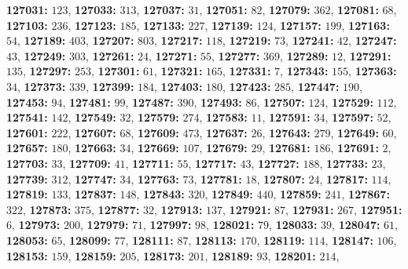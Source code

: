 \textsf{\bfseries 127031:} $123$, \textsf{\bfseries 127033:} $313$, \textsf{\bfseries 127037:} $31$, \textsf{\bfseries 127051:} $82$, \textsf{\bfseries 127079:} $362$, \textsf{\bfseries 127081:} $68$, \textsf{\bfseries 127103:} $236$, \textsf{\bfseries 127123:} $185$, \textsf{\bfseries 127133:} $227$, \textsf{\bfseries 127139:} $124$, \textsf{\bfseries 127157:} $199$, \textsf{\bfseries 127163:} $54$, \textsf{\bfseries 127189:} $403$, \textsf{\bfseries 127207:} $803$, \textsf{\bfseries 127217:} $118$, \textsf{\bfseries 127219:} $73$, \textsf{\bfseries 127241:} $42$, \textsf{\bfseries 127247:} $43$, \textsf{\bfseries 127249:} $303$, \textsf{\bfseries 127261:} $24$, \textsf{\bfseries 127271:} $55$, \textsf{\bfseries 127277:} $369$, \textsf{\bfseries 127289:} $12$, \textsf{\bfseries 127291:} $135$, \textsf{\bfseries 127297:} $253$, \textsf{\bfseries 127301:} $61$, \textsf{\bfseries 127321:} $165$, \textsf{\bfseries 127331:} $7$, \textsf{\bfseries 127343:} $155$, \textsf{\bfseries 127363:} $34$, \textsf{\bfseries 127373:} $339$, \textsf{\bfseries 127399:} $184$, \textsf{\bfseries 127403:} $180$, \textsf{\bfseries 127423:} $285$, \textsf{\bfseries 127447:} $190$, \textsf{\bfseries 127453:} $94$, \textsf{\bfseries 127481:} $99$, \textsf{\bfseries 127487:} $390$, \textsf{\bfseries 127493:} $86$, \textsf{\bfseries 127507:} $124$, \textsf{\bfseries 127529:} $112$, \textsf{\bfseries 127541:} $142$, \textsf{\bfseries 127549:} $32$, \textsf{\bfseries 127579:} $274$, \textsf{\bfseries 127583:} $11$, \textsf{\bfseries 127591:} $34$, \textsf{\bfseries 127597:} $52$, \textsf{\bfseries 127601:} $222$, \textsf{\bfseries 127607:} $68$, \textsf{\bfseries 127609:} $473$, \textsf{\bfseries 127637:} $26$, \textsf{\bfseries 127643:} $279$, \textsf{\bfseries 127649:} $60$, \textsf{\bfseries 127657:} $180$, \textsf{\bfseries 127663:} $34$, \textsf{\bfseries 127669:} $107$, \textsf{\bfseries 127679:} $29$, \textsf{\bfseries 127681:} $186$, \textsf{\bfseries 127691:} $2$, \textsf{\bfseries 127703:} $33$, \textsf{\bfseries 127709:} $41$, \textsf{\bfseries 127711:} $55$, \textsf{\bfseries 127717:} $43$, \textsf{\bfseries 127727:} $188$, \textsf{\bfseries 127733:} $23$, \textsf{\bfseries 127739:} $312$, \textsf{\bfseries 127747:} $34$, \textsf{\bfseries 127763:} $73$, \textsf{\bfseries 127781:} $18$, \textsf{\bfseries 127807:} $24$, \textsf{\bfseries 127817:} $114$, \textsf{\bfseries 127819:} $133$, \textsf{\bfseries 127837:} $148$, \textsf{\bfseries 127843:} $320$, \textsf{\bfseries 127849:} $440$, \textsf{\bfseries 127859:} $241$, \textsf{\bfseries 127867:} $322$, \textsf{\bfseries 127873:} $375$, \textsf{\bfseries 127877:} $32$, \textsf{\bfseries 127913:} $137$, \textsf{\bfseries 127921:} $87$, \textsf{\bfseries 127931:} $267$, \textsf{\bfseries 127951:} $6$, \textsf{\bfseries 127973:} $200$, \textsf{\bfseries 127979:} $71$, \textsf{\bfseries 127997:} $98$, \textsf{\bfseries 128021:} $79$, \textsf{\bfseries 128033:} $39$, \textsf{\bfseries 128047:} $61$, \textsf{\bfseries 128053:} $65$, \textsf{\bfseries 128099:} $77$, \textsf{\bfseries 128111:} $87$, \textsf{\bfseries 128113:} $170$, \textsf{\bfseries 128119:} $114$, \textsf{\bfseries 128147:} $106$, \textsf{\bfseries 128153:} $159$, \textsf{\bfseries 128159:} $205$, \textsf{\bfseries 128173:} $201$, \textsf{\bfseries 128189:} $93$, \textsf{\bfseries 128201:} $214$, 

